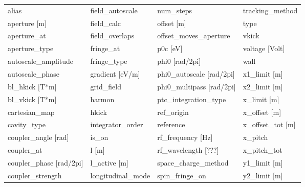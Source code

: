  \begin{tabular}{llll} \toprule
alias                            & field_autoscale                  & num_steps                        & tracking_method                  \\
aperture [m]                     & field_calc                       & offset [m]                       & type                             \\
aperture_at                      & field_overlaps                   & offset_moves_aperture            & vkick                            \\
aperture_type                    & fringe_at                        & p0c [eV]                         & voltage [Volt]                   \\
autoscale_amplitude              & fringe_type                      & phi0 [rad/2pi]                   & wall                             \\
autoscale_phase                  & gradient [eV/m]                  & phi0_autoscale [rad/2pi]         & x1_limit [m]                     \\
bl_hkick [T*m]                   & grid_field                       & phi0_multipass [rad/2pi]         & x2_limit [m]                     \\
bl_vkick [T*m]                   & harmon                           & ptc_integration_type             & x_limit [m]                      \\
cartesian_map                    & hkick                            & ref_origin                       & x_offset [m]                     \\
cavity_type                      & integrator_order                 & reference                        & x_offset_tot [m]                 \\
coupler_angle [rad]              & is_on                            & rf_frequency [Hz]                & x_pitch                          \\
coupler_at                       & l [m]                            & rf_wavelength [???]              & x_pitch_tot                      \\
coupler_phase [rad/2pi]          & l_active [m]                     & space_charge_method              & y1_limit [m]                     \\
coupler_strength                 & longitudinal_mode                & spin_fringe_on                   & y2_limit [m]                     \\

\end{tabular}
